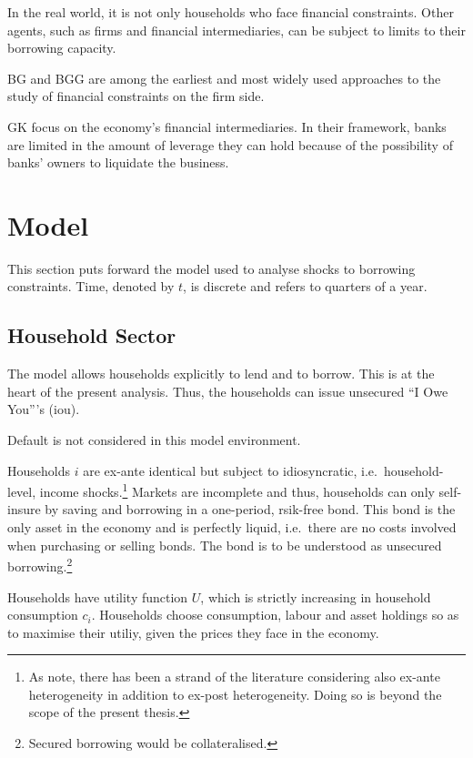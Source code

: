 \documentclass[12pt]{article} %
\numberwithin{equation}{section} %
\begin{document}
In the real world, it is not only households who face financial constraints. Other agents, such as firms and financial intermediaries, can be subject to limits to their borrowing capacity.

BG and BGG are among the earliest and most widely used approaches to the study of financial constraints on the firm side.

GK focus on the economy's financial intermediaries. In their framework, banks are limited in the amount of leverage they can hold because of the possibility of banks' owners to liquidate the business.

\section{Model}
\label{sec:model}

This section puts forward the model used to analyse shocks to borrowing constraints. Time, denoted by $t$, is discrete and refers to quarters of a year.

\subsection{Household Sector}
\label{sec:model-hh}

The model allows households explicitly to lend and to borrow. This is at the heart of the present analysis. Thus, the households can issue unsecured \enquote{I Owe You}'s (\Gls{iou}).

Default is not considered in this model environment.

Households $i$ are ex-ante identical but subject to idiosyncratic, i.e.~household-level, income shocks.\footnote{As \textcite{cherrier2023} note, there has been a strand of the literature considering also ex-ante heterogeneity in addition to ex-post heterogeneity. Doing so is beyond the scope of the present thesis.} Markets are incomplete and thus, households can only self-insure by saving and borrowing in a one-period, rsik-free bond. This bond is the only asset in the economy and is perfectly liquid, i.e.~there are no costs involved when purchasing or selling bonds. The bond is to be understood as unsecured borrowing.\footnote{Secured borrowing would be collateralised.}

Households have utility function $U$, which is strictly increasing in household consumption $c_i$. Households choose consumption, labour and asset holdings so as to maximise their utiliy, given the prices they face in the economy.
\end{document}
